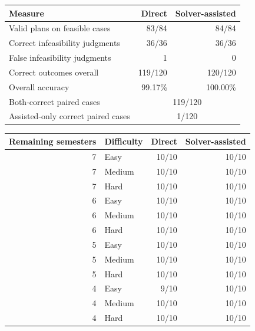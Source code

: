 \documentclass[11pt,a4paper]{article}
\begin{document}
\begin{center}
\begin{minipage}{\linewidth}
\label{tab:outcomes}
\begin{tabular}{@{}lrr@{}}
\toprule
Measure & Direct & Solver-assisted\\
\midrule
Valid plans on feasible cases & 83/84 & 84/84\\
Correct infeasibility judgments & 36/36 & 36/36\\
False infeasibility judgments & 1 & 0\\
Correct outcomes overall & 119/120 & 120/120\\
Overall accuracy & 99.17\% & 100.00\%\\
Both-correct paired cases & \multicolumn{2}{c}{119/120}\\
Assisted-only correct paired cases & \multicolumn{2}{c}{1/120}\\
\bottomrule
\end{tabular}
\end{minipage}
\end{center}

\begin{center}
\begin{minipage}{\linewidth}
\label{tab:cells}
\begin{tabular}{@{}rlrr@{}}
\toprule
Remaining semesters & Difficulty & Direct & Solver-assisted\\
\midrule
7 & Easy & 10/10 & 10/10\\
7 & Medium & 10/10 & 10/10\\
7 & Hard & 10/10 & 10/10\\
6 & Easy & 10/10 & 10/10\\
6 & Medium & 10/10 & 10/10\\
6 & Hard & 10/10 & 10/10\\
5 & Easy & 10/10 & 10/10\\
5 & Medium & 10/10 & 10/10\\
5 & Hard & 10/10 & 10/10\\
4 & Easy & 9/10 & 10/10\\
4 & Medium & 10/10 & 10/10\\
4 & Hard & 10/10 & 10/10\\
\bottomrule
\end{tabular}
\end{minipage}
\end{center}
\end{document}
